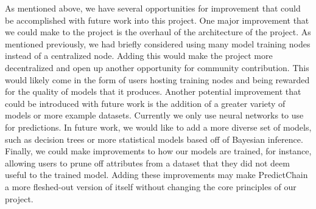 \documentclass{article}
\begin{document}
    As mentioned above, we have several opportunities for improvement that could be accomplished with future work
    into this project.  One major improvement that we could make to the project is the overhaul of the architecture of
    the project.  As mentioned previously, we had briefly considered using many model training nodes instead of a
    centralized node.  Adding this would make the project more decentralized and open up another opportunity
    for community contribution.  This would likely come in the form of users hosting training nodes and being rewarded for
    the quality of models that it produces.  Another potential improvement that could be introduced with future work is
    the addition of a greater variety of models or more example datasets.  Currently we only use neural networks to
    use for predictions.  In future work, we would like to add a more diverse set of models, such as decision trees or
    more statistical models based off of Bayesian inference.  Finally, we could make improvements to how our models are
    trained, for instance, allowing users to prune off attributes from a dataset that they did not deem useful to the
    trained model.  Adding these improvements may make PredictChain a more fleshed-out version of itself without changing
    the core principles of our project.

    \pagebreak
    
    
\end{document}
